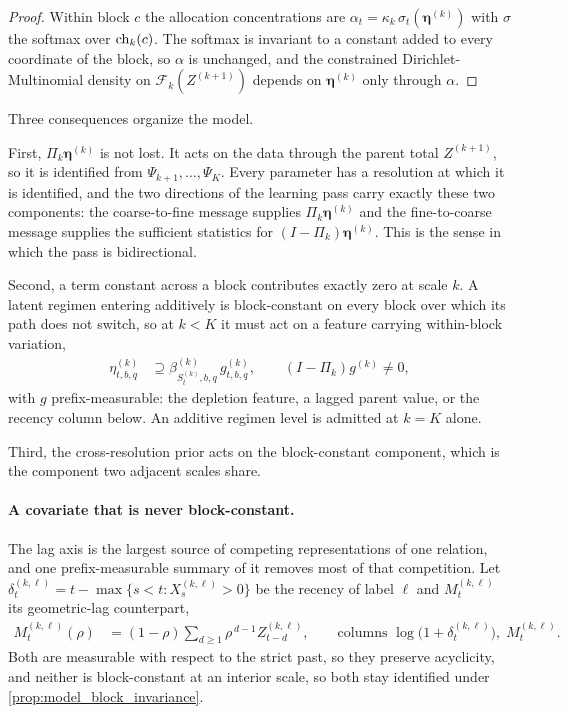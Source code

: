 \begin{proof}
Within block \(c\) the allocation concentrations are
\(\alpha_t=\kappa_k\,\sigma_t(\boldsymbol\eta^{(k)})\) with \(\sigma\) the
softmax over \(\operatorname{ch}_k(c)\). The softmax is invariant to a constant added to
every coordinate of the block, so \(\alpha\) is unchanged, and the constrained
Dirichlet-Multinomial density on \(\mathcal F_k(Z^{(k+1)})\) depends on
\(\boldsymbol\eta^{(k)}\) only through \(\alpha\).
\end{proof}

Three consequences organize the model.

First, \(\Pi_k\boldsymbol\eta^{(k)}\) is not lost. It acts on the data through
the parent total \(Z^{(k+1)}\), so it is identified from
\(\Psi_{k+1},\ldots,\Psi_K\). Every parameter has a resolution at which it is
identified, and the two directions of the learning pass carry exactly these two
components: the coarse-to-fine message supplies \(\Pi_k\boldsymbol\eta^{(k)}\)
and the fine-to-coarse message supplies the sufficient statistics for
\((I-\Pi_k)\boldsymbol\eta^{(k)}\). This is the sense in which the pass is
bidirectional.

Second, a term constant across a block contributes exactly zero at scale \(k\).
A latent regimen entering additively is block-constant on every block over
which its path does not switch, so at \(k<K\) it must act on a feature carrying
within-block variation,
\begin{align}
 \eta_{t,b,q}^{(k)}
 &\supseteq\beta_{S_t^{(k)},b,q}^{(k)}\,g_{t,b,q}^{(k)},
 \qquad (I-\Pi_k)g^{(k)}\neq0,
 \label{eq:model_regime_interaction}
\end{align}
with \(g\) prefix-measurable: the depletion feature, a lagged parent value, or
the recency column below. An additive regimen level is admitted at \(k=K\)
alone.

Third, the cross-resolution prior acts on the block-constant component, which
is the component two adjacent scales share.

\paragraph{A covariate that is never block-constant.}

The lag axis is the largest source of competing representations of one
relation, and one prefix-measurable summary of it removes most of that
competition. Let \(\delta_t^{(k,\ell)}=t-\max\{s<t:X_s^{(k,\ell)}>0\}\) be the
recency of label \(\ell\) and \(M_t^{(k,\ell)}\) its geometric-lag counterpart,
\begin{align}
 M_t^{(k,\ell)}(\rho)
 &=(1-\rho)\sum_{d\geq1}\rho^{\,d-1}Z_{t-d}^{(k,\ell)},
 \qquad\text{columns }
 \log\bigl(1+\delta_t^{(k,\ell)}\bigr),\;M_t^{(k,\ell)}.
 \label{eq:model_recency}
\end{align}
Both are measurable with respect to the strict past, so they preserve
acyclicity, and neither is block-constant at an interior scale, so both stay
identified under \cref{prop:model_block_invariance}.


